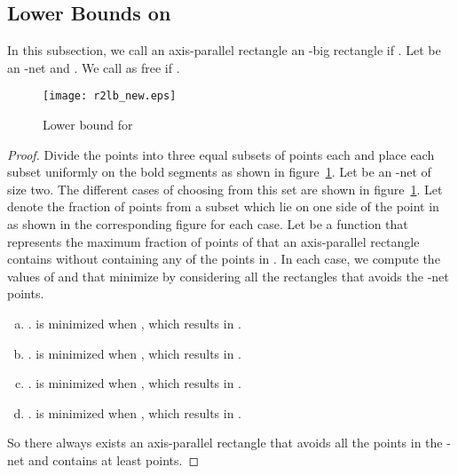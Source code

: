 \subsection{Lower Bounds on }
In this subsection, we call an axis-parallel rectangle  an -big rectangle if . Let  be an -net and . We call   as free if .
\begin{lem}\label{lemma2RL}
 
\end{lem}
\begin{figure}
\begin{center}
\texttt{[image: r2lb\_new.eps]}
\caption{Lower bound for }
\label{fig2RL}
\end{center}
\end{figure}
\begin{proof}
 Divide the  points into three equal subsets of 
points each and place each subset uniformly
on the bold segments as shown in figure~\ref{fig2RL}. Let  be an
-net of size two. The different cases of choosing
 from this set are shown in figure~\ref{fig2RL}. Let  denote the fraction of
points from a subset which lie on one side of the point in  as shown in the
corresponding figure for each case. Let  be a function that represents the
maximum fraction of points of  
that an axis-parallel rectangle contains without
containing any of the points in . In each case, we compute the values of 
 and  that minimize  by considering all the rectangles that avoids the -net points.

\begin{enumerate}[(a)]
 \item .  is minimized when
, which results in .
 \item .  is minimized when
, which results in .
 \item .  is minimized when
, which results in .
 \item .  is minimized when
, which results in .
\end{enumerate}
So there always exists an axis-parallel rectangle that avoids all the points in the -net
and contains at least  points.

\end{proof}

